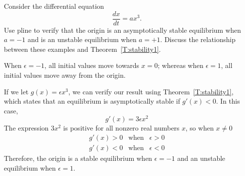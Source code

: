 \documentclass{ximera}
\begin{document}
\begin{exercise} \label{c3.3.5}
Consider the differential equation
\[
\frac{dx}{dt} = a x^3.
\]
Use {\sf pline} to verify that the origin is an asymptotically
stable equilibrium when $a = -1$ and is an unstable
equilibrium when $a = +1$. Discuss the relationship
between these examples and Theorem~\ref{T:stability1}.

\begin{solution}

\ans When $\epsilon = -1$, all initial values move towards $x = 0$; whereas
when $\epsilon = 1$, all initial values move away from the origin. 

\soln If we let $g(x) = \epsilon x^3$, we can verify our result using
Theorem~\ref{T:stability1}, which states
that an equilibrium is asymptotically stable if $g'(x) < 0$.  In this case,
\[
g'(x) = 3\epsilon x^2
\]
The expression $3x^2$ is positive for all nonzero real numbers $x$, so
when $x \neq 0$
\[ \begin{array}{ccc}
g'(x) > 0 & \mbox{when} & \epsilon > 0 \\
g'(x) < 0 & \mbox{when} & \epsilon < 0 \end{array}
\]
Therefore, the origin is a stable equilibrium when $\epsilon = -1$ and
an unstable equilibrium when $\epsilon = 1$.

\end{solution}
\end{exercise}

\TEXER
\end{document}
